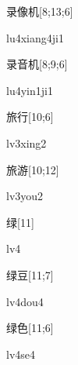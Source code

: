 \begin{verbete}[lu4xiang4ji1]{录像机}[8;13;6]
\begin{pronuncia}{lu4xiang4ji1}
\end{pronuncia}
\end{verbete}

\begin{verbete}[lu4yin1ji1]{录音机}[8;9;6]
\begin{pronuncia}{lu4yin1ji1}
\end{pronuncia}
\end{verbete}

\begin{verbete}[lv3xing2]{旅行}[10;6]
\begin{pronuncia}{lv3xing2}
\end{pronuncia}
\end{verbete}

\begin{verbete}[lv3you2]{旅游}[10;12]
\begin{pronuncia}{lv3you2}
\end{pronuncia}
\end{verbete}

\begin{verbete}[lv4]{绿}[11]
\begin{pronuncia}{lv4}
\end{pronuncia}
\end{verbete}

\begin{verbete}[lv4dou4]{绿豆}[11;7]
\begin{pronuncia}{lv4dou4}
\end{pronuncia}
\end{verbete}

\begin{verbete}[lv4se4]{绿色}[11;6]
\begin{pronuncia}{lv4se4}
\end{pronuncia}
\end{verbete}

